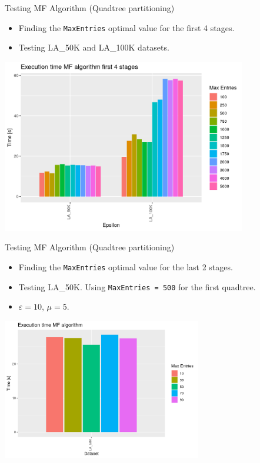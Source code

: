 \documentclass{beamer}
\begin{document}
\begin{frame}{Testing MF Algorithm (Quadtree partitioning)}
    \begin{itemize}
        \item Finding the \texttt{MaxEntries} optimal value for the first 4 stages.
        \item Testing LA\_50K and LA\_100K datasets. 
    \end{itemize}
    \centering
    \includegraphics[width=0.8\textwidth]{figures/05_QuadtreeFirstStages.png}
\end{frame}

\begin{frame}{Testing MF Algorithm (Quadtree partitioning)}
    \begin{itemize}
        \item Finding the \texttt{MaxEntries} optimal value for the last 2 stages.
        \item Testing LA\_50K. Using \texttt{MaxEntries = 500} for the first quadtree.
        \item $\varepsilon = 10$, $\mu = 5$.
    \end{itemize}
    \centering
    \includegraphics[width=0.65\textwidth]{figures/06_Quadtree2LA_50K.png}
\end{frame}
\end{document}
